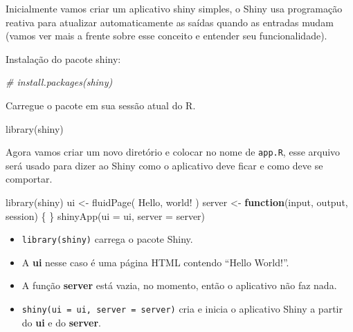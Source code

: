 \documentclass[
]{book}
\newenvironment{Shaded}{\begin{snugshade}}{\end{snugshade}}
\newcommand{\AttributeTok}[1]{\textcolor[rgb]{0.77,0.63,0.00}{#1}}
\newcommand{\CommentTok}[1]{\textcolor[rgb]{0.56,0.35,0.01}{\textit{#1}}}
\newcommand{\ControlFlowTok}[1]{\textcolor[rgb]{0.13,0.29,0.53}{\textbf{#1}}}
\newcommand{\FunctionTok}[1]{\textcolor[rgb]{0.00,0.00,0.00}{#1}}
\newcommand{\NormalTok}[1]{#1}
\newcommand{\OtherTok}[1]{\textcolor[rgb]{0.56,0.35,0.01}{#1}}
\newcommand{\StringTok}[1]{\textcolor[rgb]{0.31,0.60,0.02}{#1}}
\begin{document}
Inicialmente vamos criar um aplicativo shiny simples, o Shiny usa programação reativa para atualizar automaticamente as saídas quando as entradas mudam (vamos ver mais a frente sobre esse conceito e entender seu funcionalidade).

Instalação do pacote shiny:

\begin{Shaded}
\begin{Highlighting}[]
\CommentTok{\# install.packages(\textquotesingle{}shiny\textquotesingle{})}
\end{Highlighting}
\end{Shaded}

Carregue o pacote em sua sessão atual do R.

\begin{Shaded}
\begin{Highlighting}[]
\FunctionTok{library}\NormalTok{(shiny)}
\end{Highlighting}
\end{Shaded}

Agora vamos criar um novo diretório e colocar no nome de \texttt{app.R}, esse arquivo será usado para dizer ao Shiny como o aplicativo deve ficar e como deve se comportar.

\begin{Shaded}
\begin{Highlighting}[]
\FunctionTok{library}\NormalTok{(shiny)}
\NormalTok{ui }\OtherTok{\textless{}{-}} \FunctionTok{fluidPage}\NormalTok{(}
   \StringTok{\textquotesingle{}Hello, world!\textquotesingle{}}
\NormalTok{)}
\NormalTok{server }\OtherTok{\textless{}{-}} \ControlFlowTok{function}\NormalTok{(input, output, session) \{}
\NormalTok{\}}
\FunctionTok{shinyApp}\NormalTok{(}\AttributeTok{ui =}\NormalTok{ ui, }\AttributeTok{server =}\NormalTok{ server)}
\end{Highlighting}
\end{Shaded}

\begin{itemize}
\item
  \texttt{library(shiny)} carrega o pacote Shiny.
\item
  A \textbf{ui} nesse caso é uma página HTML contendo ``Hello World!''.
\item
  A função \textbf{server} está vazia, no momento, então o aplicativo não faz nada.
\item
  \texttt{shiny(ui\ =\ ui,\ server\ =\ server)} cria e inicia o aplicativo Shiny a partir do \textbf{ui} e do \textbf{server}.
\end{itemize}
\end{document}
